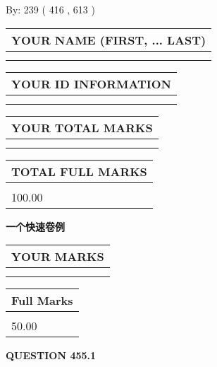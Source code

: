 \documentclass{ctexart}
\begin{document}
   
\hspace{1.0in} By: 
 239 ( 416 ,  613 )
   
   
   
   
\newpage 
\setcounter{page}{ 
   455001 } 
   
   
   
   
\noindent\begin{tabular}{|l|}
\hline
YOUR NAME (FIRST, ... LAST)  \\
\hline
 \\ 
 \\ 
\hline
\end{tabular}
\hspace{0.05in} \begin{tabular}{|l|}
\hline
 YOUR   ID   INFORMATION  \\
\hline
 \\ 
 \\ 
\hline
\end{tabular}
   
   
\vspace{0.2in}\noindent\begin{tabular}{|l|}
\hline
YOUR TOTAL MARKS  \\
\hline
 \\ 
 \\ 
\hline
\end{tabular}
\hspace{0.05in} \begin{tabular}{|l|}
\hline
TOTAL FULL MARKS  \\
\hline
 \\ 
100.00 \\
\hline
\end{tabular}
   
   
 \vspace{0.2in}
{\LARGE {\textbf{ 一个快速卷例}}}
   
   
  
\vspace{0.2in}
  
\noindent\begin{tabular}{|l|}
\hline
 YOUR MARKS  \\
\hline
 \\ 
 \\ 
\hline
\end{tabular}
\hspace{0.05in} \begin{tabular}{|l|}
\hline
 Full Marks  \\
\hline
 \\ 
50.00 \\
\hline
\end{tabular}
{\textbf{\Large{QUESTION
455.1 
}}}
  
\end{document}
